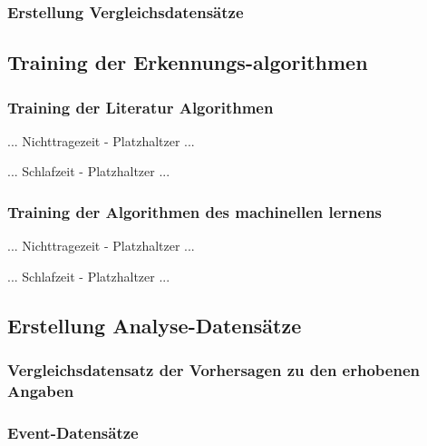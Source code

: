 \subsubsection{Erstellung Vergleichsdatensätze}



\subsection{Training der Erkennungs-algorithmen}

\subsubsection{Training der Literatur Algorithmen}

... Nichttragezeit - Platzhaltzer ... 

\bigskip

... Schlafzeit - Platzhaltzer ...

\subsubsection{Training der Algorithmen des machinellen lernens}

... Nichttragezeit - Platzhaltzer ... 

\bigskip

... Schlafzeit - Platzhaltzer ...




\subsection{Erstellung Analyse-Datensätze}

\subsubsection{Vergleichsdatensatz der Vorhersagen zu den erhobenen Angaben}


\subsubsection{Event-Datensätze}